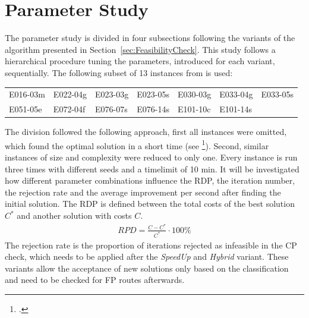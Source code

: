 \section{Parameter Study}
\label{sec:parameter_study}

The parameter study is divided in four subsections following the variants of the algorithm
presented in Section~\ref{sec:FeasibilityCheck}. This study follows a hierarchical procedure
tuning the parameters, introduced for each variant, sequentially. The following subset of 13
instances from \gendreauDataSetText is used:


\begin{table}[ht]
	\centering
	\setlength{\tabcolsep}{0.75em}
	\def\arraystretch{1.5}
	\begin{tabular}{lllllll}
		E016-03m & E022-04g & E023-03g & E023-05s & E030-03g & E033-04g & E033-05s \\
		E051-05e & E072-04f & E076-07s & E076-14s & E101-10c & E101-14s &          \\
	\end{tabular}
\end{table}

The division followed the following approach, first all instances were omitted, which found
the optimal solution in a short time (see \cite{tamke_branch-and-cut_2024}\footcite[cf.][p.26]{tamke_branch-and-cut_2024}).
Second, similar instances of size and complexity were reduced to only one.
Every instance is run three times with different seeds and a timelimit of 10 min. It will be investigated
how different parameter combinations influence the \gls{RDP}, the iteration number, the rejection rate and
the average improvement per second after finding the initial solution. The \gls{RDP} is defined between the
total costs of the best solution $C^*$ and another solution with costs $C$.
\begin{align}
	RPD = \frac{C - C^*}{C^*} \cdot 100\%
\end{align}
The rejection rate is the proportion of iterations rejected as infeasible in the \gls{CP} check, which needs
to be applied after the \textit{SpeedUp} and \textit{Hybrid} variant. These variants allow the acceptance of
new solutions only based on the classification and need to be checked for \gls{FP} routes afterwards.

